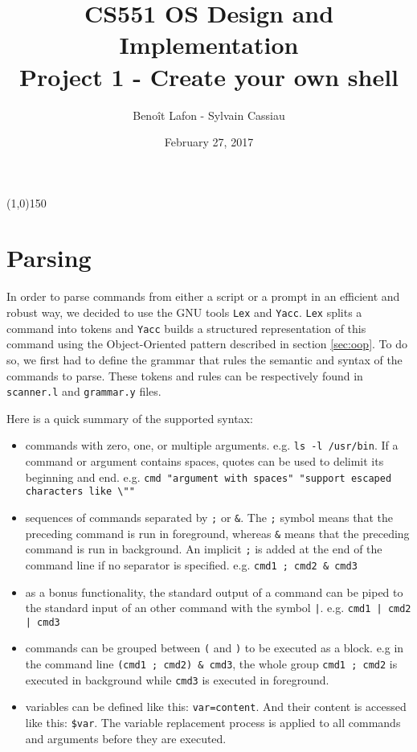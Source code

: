 \documentclass[fleqn]{article}
\title{CS551 OS Design and Implementation\\Project 1 - Create your own shell}
\author{Benoît Lafon - Sylvain Cassiau}
\date{February 27, 2017}
\begin{document}
\maketitle

\begin{center}
\line(1,0){150}
\vspace{1cm}
\end{center}

\section{Parsing}

In order to parse commands from either a script or a prompt in an efficient and robust way, we decided to use the GNU tools \texttt{Lex} and \texttt{Yacc}.
\texttt{Lex} splits a command into tokens and \texttt{Yacc} builds a structured representation of this command using the Object-Oriented pattern described in section \ref{sec:oop}.
To do so, we first had to define the grammar that rules the semantic and syntax of the commands to parse. These tokens and rules can be respectively found in \texttt{scanner.l} and \texttt{grammar.y} files.

Here is a quick summary of the supported syntax:
\begin{itemize}
    \item commands with zero, one, or multiple arguments. e.g. \texttt{ls -l /usr/bin}. If a command or argument contains spaces, quotes can be used to delimit its beginning and end. e.g. \texttt{cmd "argument with spaces" "support escaped characters like \textbackslash""}
    \item sequences of commands separated by \texttt{;} or \texttt{\&}. The \texttt{;} symbol means that the preceding command is run in foreground, whereas \texttt{\&} means that the preceding command is run in background. An implicit \texttt{;} is added at the end of the command line if no separator is specified. e.g. \texttt{cmd1 ; cmd2 \& cmd3}
    \item as a bonus functionality, the standard output of a command can be piped to the standard input of an other command with the symbol \texttt{|}. e.g. \texttt{cmd1 | cmd2 | cmd3}
    \item commands can be grouped between \texttt{(} and \texttt{)} to be executed as a block. e.g in the command line \texttt{(cmd1 ; cmd2) \& cmd3}, the whole group \texttt{cmd1 ; cmd2} is executed in background while \texttt{cmd3} is executed in foreground.
    \item variables can be defined like this: \texttt{var=content}. And their content is accessed like this: \texttt{\$var}. The variable replacement process is applied to all commands and arguments before they are executed.
\end{itemize}
\end{document}
